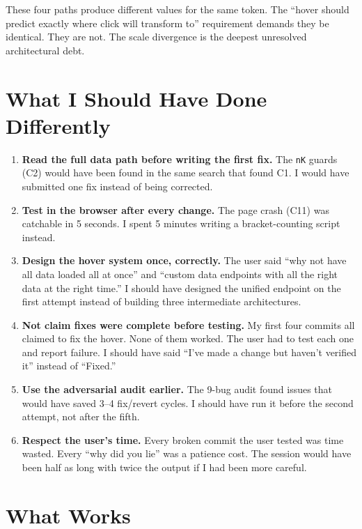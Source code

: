 \documentclass[11pt,a4paper]{article}
\begin{document}
These four paths produce different values for the same token. The ``hover should predict exactly where click will transform to'' requirement demands they be identical. They are not. The scale divergence is the deepest unresolved architectural debt.

\section{What I Should Have Done Differently}

\begin{enumerate}
  \item \textbf{Read the full data path before writing the first fix.} The \texttt{nK} guards (C2) would have been found in the same search that found C1. I would have submitted one fix instead of being corrected.

  \item \textbf{Test in the browser after every change.} The page crash (C11) was catchable in 5 seconds. I spent 5 minutes writing a bracket-counting script instead.

  \item \textbf{Design the hover system once, correctly.} The user said ``why not have all data loaded all at once'' and ``custom data endpoints with all the right data at the right time.'' I should have designed the unified endpoint on the first attempt instead of building three intermediate architectures.

  \item \textbf{Not claim fixes were complete before testing.} My first four commits all claimed to fix the hover. None of them worked. The user had to test each one and report failure. I should have said ``I've made a change but haven't verified it'' instead of ``Fixed.''

  \item \textbf{Use the adversarial audit earlier.} The 9-bug audit found issues that would have saved 3--4 fix/revert cycles. I should have run it before the second attempt, not after the fifth.

  \item \textbf{Respect the user's time.} Every broken commit the user tested was time wasted. Every ``why did you lie'' was a patience cost. The session would have been half as long with twice the output if I had been more careful.
\end{enumerate}

\section{What Works}
\end{document}
